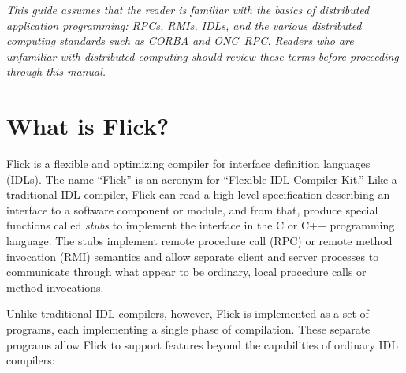 

\emph{This guide assumes that the reader is familiar with the basics of
distributed application programming: RPCs, RMIs, IDLs, and the various
distributed computing standards such as CORBA and ONC~RPC\@.  Readers who are
unfamiliar with distributed computing should review these terms before
proceeding through this manual.}



\section{What is Flick?}
\label{sec:What is Flick?}

Flick is a flexible and optimizing compiler for interface definition languages
(IDLs).  The name ``Flick'' is an acronym for ``Flexible IDL Compiler Kit.''
Like a traditional IDL compiler, Flick can read a high-level specification
describing an interface to a software component or module, and from that,
produce special functions called \emph{stubs} to implement the interface in the
C or C++ programming language.  The stubs implement remote procedure call (RPC)
or remote method invocation (RMI) semantics and allow separate client and
server processes to communicate through what appear to be ordinary, local
procedure calls or method invocations.

Unlike traditional IDL compilers, however, Flick is implemented as a set of
programs, each implementing a single phase of compilation.  These separate
programs allow Flick to support features beyond the capabilities of ordinary
IDL compilers:

